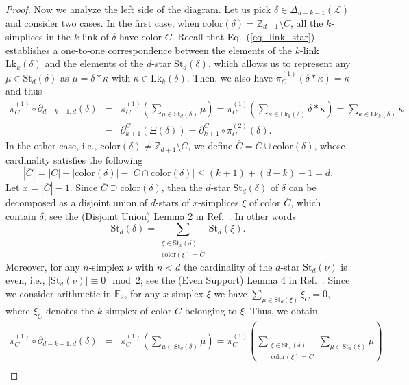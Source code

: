 \documentclass[onecolumn,letterpaper,11pt,accepted=2022-12-19]{quantumarticle}
\newcommand{\face}[2]{{\Delta_{#1}(#2)}}
\newcommand{\link}[2]{{\mathrm{Lk}_{#1}(#2)}}
\renewcommand{\star}[2]{{\mathrm{St}_{#1}(#2)}}
\newcommand{\bnd}[2]{\partial_{#1,#2}}
\newcommand{\col}[1]{{\mathrm{color}(#1)}}
\theoremstyle{definition}
\theoremstyle{lemma}
\theoremstyle{theorem}
\theoremstyle{corollary}
\begin{document}
{\begin{proof}
Now we analyze the left side of the diagram.
Let us pick $\delta\in\face{d-k-1}{\mathcal{L}}$ and consider two cases.
In the first case, when $\col{\delta} = \mathbb{Z}_{d+1}\setminus C$, all the $k$-simplices in the $k$-link of $\delta$ have color $C$.
Recall that Eq.~(\ref{eq_link_star}) establishes a one-to-one correspondence between the elements of the $k$-link $\link k \delta$ and the elements of the $d$-star $\star d \delta$, which allows us to represent any $\mu\in\star d \delta$ as $\mu = \delta *\kappa$ with $\kappa\in\link{k}{\delta}$.
Then, we also have $\pi^{(1)}_C (\delta * \kappa) = \kappa$ and thus
\begin{eqnarray}
\pi^{(1)}_C \circ \bnd{d-k-1}{d} (\delta)
&=&\pi^{(1)}_C \left(\sum_{\mu\in\star{d}{\delta}} \mu \right)
= \pi^{(1)}_C \left(\sum_{\kappa\in\link{k}{\delta}} \delta * \kappa \right)
= \sum_{\kappa\in\link{k}{\delta}} \kappa\\
&=& \partial_{k+1}^C(\Xi(\delta)) = \partial_{k+1}^C \circ \pi^{(2)}_C (\delta).
\end{eqnarray}
In the other case, i.e., $\col{\delta} \neq \mathbb{Z}_{d+1}\setminus C$, we define
$\overline C = C \cup \col \delta$, whose cardinality satisfies the following
\begin{equation}
|\overline C | = |C| + |\col \delta| - |C \cap \col \delta | \leq (k+1) + (d-k) - 1 = d.
\end{equation}
Let $x = |\overline C | - 1$.
Since $\overline C \supseteq \col \delta$, then the $d$-star $\star d \delta$ of $\delta$ can be decomposed as a disjoint union of $d$-stars of $x$-simplices $\xi$ of color $\overline C$, which contain $\delta$; see the (Disjoint Union) Lemma 2 in Ref.~\cite{Kubica2015a}.
In other words
\begin{equation}
\star{d}{\delta} = \sum_{\substack{\xi\in\star{x}{\delta}\\ \col{\xi} = \overline C}} \star{d}{\xi}.
\end{equation}
Moreover, for any $n$-simplex $\nu$ with $n< d$ the cardinality of the $d$-star $\star d \nu$ is even, i.e., $|\star{d}{\nu}| \equiv 0 \mod 2$; see the (Even Support) Lemma 4 in Ref.~\cite{Kubica2015a}.
Since we consider arithmetic in $\mathbb{F}_2$,  for any $x$-simplex $\xi$ we have $\sum_{\mu\in \star d \xi} \xi_C = 0$, where $\xi_C$ denotes the $k$-simplex of color $C$ belonging to $\xi$.
Thus, we obtain
\begin{eqnarray}
\pi^{(1)}_C \circ \bnd{d-k-1}{d} (\delta) &=& \pi^{(1)}_C \left(\sum_{\mu\in\star{d}{\delta}} \mu \right) =
\pi^{(1)}_C \left(\sum_{\substack{\xi\in\star{x}{\delta} \\ \col{\xi} = \overline C} } \sum_{\mu\in\star{d}{\xi}} \mu \right)\\

\end{eqnarray}
\end{proof}}
\end{document}
